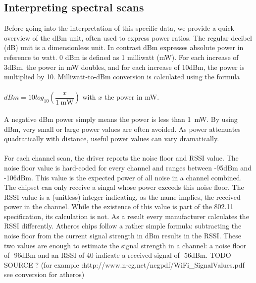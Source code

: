 \documentclass[a4paper, 11pt]{article}
\begin{document}
\subsection{Interpreting spectral scans}
Before going into the interpretation of this specific data, we provide a quick overview of the dBm unit, often used to express power ratios. The regular decibel (dB) unit is a dimensionless unit. In contrast dBm expresses absolute power in reference to watt. 0 dBm is defined as 1 milliwatt (mW). For each increase of 3dBm, the power in mW doubles, and for each increase of 10dBm, the power is multiplied by 10. Milliwatt-to-dBm conversion is calculated using the formula\\ \\ $dBm = 10 log_{10}(\dfrac{x}{\SI{1}{\milli\watt}})$ with $x$ the power in mW.\\ \\ A negative dBm power simply means the power is less than \SI{1}{\milli\watt}. By using dBm, very small or large power values are often avoided. As power attenuates quadratically with distance, useful power values can vary dramatically.\\\\
For each channel scan, the driver reports the noise floor and RSSI value. The noise floor value is hard-coded for every channel and ranges between -95dBm and -106dBm. This value is the expected power of all noise in a channel combined. The chipset can only receive a singal whose power exceeds this noise floor. The RSSI value is a (unitless) integer indicating, as the name implies, the received power in the channel. While the existence of this value is part of the 802.11 specification, its calculation is not. As a result every manufacturer calculates the RSSI differently. Atheros chips follow a rather simple formula: subtracting the noise floor from the current signal strength in dBm results in the RSSI. These two values are enough to estimate the signal strength in a channel: a noise floor of -96dBm and an RSSI of 40 indicate a received signal of -56dBm. TODO SOURCE ? (for example :http://www.n-cg.net/ncgpdf/WiFi\_SignalValues.pdf see conversion for atheros) \\
\end{document}
